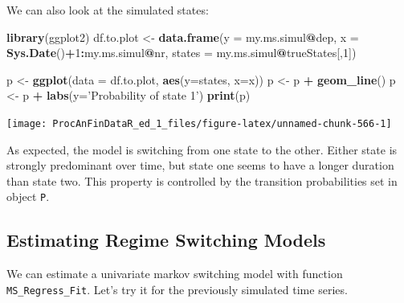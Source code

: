 \documentclass[11pt,]{book}
\newenvironment{Shaded}{\begin{snugshade}}{\end{snugshade}}
\newcommand{\KeywordTok}[1]{\textcolor[rgb]{0.27,0.27,0.27}{\textbf{#1}}}
\newcommand{\DataTypeTok}[1]{\textcolor[rgb]{0.27,0.27,0.27}{#1}}
\newcommand{\DecValTok}[1]{\textcolor[rgb]{0.06,0.06,0.06}{#1}}
\newcommand{\StringTok}[1]{\textcolor[rgb]{0.5,0.5,0.5}{#1}}
\newcommand{\OperatorTok}[1]{\textcolor[rgb]{0.81,0.36,0.00}{\textbf{#1}}}
\newcommand{\NormalTok}[1]{#1}
\begin{document}
We can also look at the simulated states:

\begin{Shaded}
\begin{Highlighting}[]
\KeywordTok{library}\NormalTok{(ggplot2)}
\NormalTok{df.to.plot <-}\StringTok{ }\KeywordTok{data.frame}\NormalTok{(}\DataTypeTok{y =}\NormalTok{ my.ms.simul}\OperatorTok{@}\NormalTok{dep, }
                         \DataTypeTok{x =} \KeywordTok{Sys.Date}\NormalTok{()}\OperatorTok{+}\DecValTok{1}\OperatorTok{:}\NormalTok{my.ms.simul}\OperatorTok{@}\NormalTok{nr,}
                         \DataTypeTok{states =}\NormalTok{ my.ms.simul}\OperatorTok{@}\NormalTok{trueStates[,}\DecValTok{1}\NormalTok{])}

\NormalTok{p <-}\StringTok{ }\KeywordTok{ggplot}\NormalTok{(}\DataTypeTok{data =}\NormalTok{ df.to.plot, }\KeywordTok{aes}\NormalTok{(}\DataTypeTok{y=}\NormalTok{states, }\DataTypeTok{x=}\NormalTok{x))}
\NormalTok{p <-}\StringTok{ }\NormalTok{p }\OperatorTok{+}\StringTok{ }\KeywordTok{geom_line}\NormalTok{()}
\NormalTok{p <-}\StringTok{ }\NormalTok{p }\OperatorTok{+}\StringTok{ }\KeywordTok{labs}\NormalTok{(}\DataTypeTok{y=}\StringTok{'Probability of state 1'}\NormalTok{)}
\KeywordTok{print}\NormalTok{(p)}
\end{Highlighting}
\end{Shaded}

\begin{center}\texttt{[image: ProcAnFinDataR\_ed\_1\_files/figure-latex/unnamed-chunk-566-1]} \end{center}

As expected, the model is switching from one state to the other. Either
state is strongly predominant over time, but state one seems to have a
longer duration than state two. This property is controlled by the
transition probabilities set in object \texttt{P}.

\subsection{Estimating Regime Switching
Models}\label{estimating-regime-switching-models}

We can estimate a univariate markov switching model with function
\texttt{MS\_Regress\_Fit}. Let's try it for the previously simulated
time series.
\end{document}
